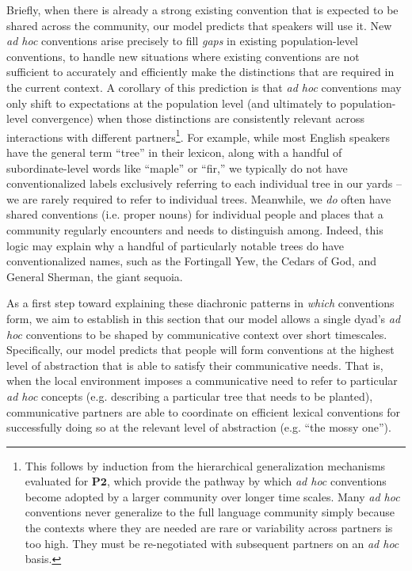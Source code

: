 Briefly, when there is already a strong existing convention that is expected to be shared across the community, our model predicts that speakers will use it. 
New \emph{ad hoc} conventions arise precisely to fill \emph{gaps} in existing population-level conventions, to handle new situations where existing conventions are not sufficient to accurately and efficiently make the distinctions that are required in the current context. 
A corollary of this prediction is that \emph{ad hoc} conventions may only shift to expectations at the population level (and ultimately to population-level convergence) when those distinctions are consistently relevant across interactions with different partners\footnote{This follows by induction from the hierarchical generalization mechanisms evaluated for $\textbf{P2}$, which provide the pathway by which \emph{ad hoc} conventions become adopted by a larger community over longer time scales. Many \emph{ad hoc} conventions never generalize to the full language community simply because the contexts where they are needed are rare or variability across partners is too high. They must be re-negotiated with subsequent partners on an \emph{ad hoc} basis.}.
For example, while most English speakers have the general term  ``tree'' in their lexicon, along with a handful of subordinate-level words like ``maple'' or ``fir,'' we typically do not have conventionalized labels exclusively referring to each individual tree in our yards -- we are rarely required to refer to individual trees.
Meanwhile, we \emph{do} often have shared conventions (i.e. proper nouns) for individual people and places that a community regularly encounters and needs to distinguish among.
Indeed, this logic may explain why a handful of particularly notable trees do have conventionalized names, such as the Fortingall Yew, the Cedars of God, and General Sherman, the giant sequoia.

As a first step toward explaining these diachronic patterns in \emph{which} conventions form, we aim to establish in this section that our model allows a single dyad's \emph{ad hoc} conventions to be shaped by communicative context over short timescales.
Specifically, our model predicts that people will form conventions at the highest level of abstraction that is able to satisfy their communicative needs.
That is, when the local environment imposes a communicative need to refer to particular \emph{ad hoc} concepts (e.g. describing a particular tree that needs to be planted), communicative partners are able to coordinate on efficient lexical conventions for successfully doing so at the relevant level of abstraction (e.g. ``the mossy one'').

